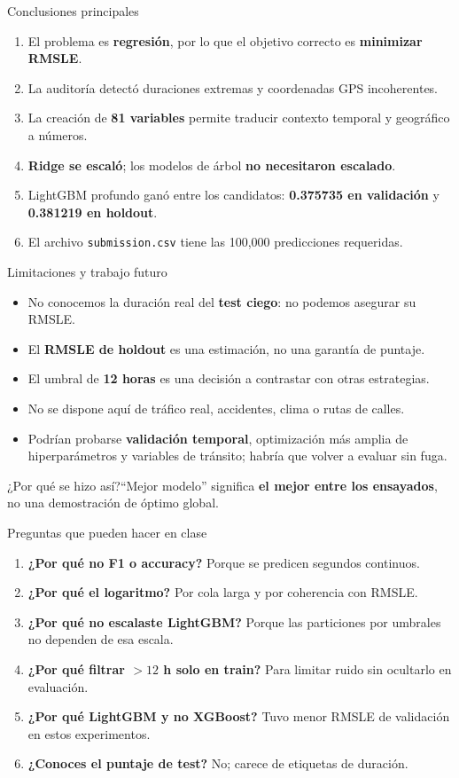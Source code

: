\documentclass[aspectratio=169,11pt]{beamer}
\newcommand{\clav}[1]{\textcolor{UNAMteal}{\textbf{#1}}}
\newcommand{\porq}[1]{\vspace{1.2mm}\begin{block}{¿Por qué se hizo así?}\small #1\end{block}}
\begin{document}
\begin{frame}{Conclusiones principales}
\begin{enumerate}
\item El problema es \textbf{regresión}, por lo que el objetivo correcto es \textbf{minimizar RMSLE}.
\item La auditoría detectó duraciones extremas y coordenadas GPS incoherentes.
\item La creación de \textbf{81 variables} permite traducir contexto temporal y geográfico a números.
\item \textbf{Ridge se escaló}; los modelos de árbol \textbf{no necesitaron escalado}.
\item LightGBM profundo ganó entre los candidatos: \clav{0.375735 en validación} y \clav{0.381219 en holdout}.
\item El archivo \texttt{submission.csv} tiene las 100,000 predicciones requeridas.
\end{enumerate}
\end{frame}

\begin{frame}{Limitaciones y trabajo futuro}
\begin{itemize}
\item No conocemos la duración real del \textbf{test ciego}: no podemos asegurar su RMSLE.
\item El \textbf{RMSLE de holdout} es una estimación, no una garantía de puntaje.
\item El umbral de \textbf{12 horas} es una decisión a contrastar con otras estrategias.
\item No se dispone aquí de tráfico real, accidentes, clima o rutas de calles.
\item Podrían probarse \textbf{validación temporal}, optimización más amplia de hiperparámetros y variables de tránsito; habría que volver a evaluar sin fuga.
\end{itemize}
\porq{``Mejor modelo'' significa \textbf{el mejor entre los ensayados}, no una demostración de óptimo global.}
\end{frame}

\begin{frame}{Preguntas que pueden hacer en clase}
\small
\begin{enumerate}
\item \textbf{¿Por qué no F1 o accuracy?} Porque se predicen segundos continuos.
\item \textbf{¿Por qué el logaritmo?} Por cola larga y por coherencia con RMSLE.
\item \textbf{¿Por qué no escalaste LightGBM?} Porque las particiones por umbrales no dependen de esa escala.
\item \textbf{¿Por qué filtrar $>12$ h solo en train?} Para limitar ruido sin ocultarlo en evaluación.
\item \textbf{¿Por qué LightGBM y no XGBoost?} Tuvo menor RMSLE de validación en estos experimentos.
\item \textbf{¿Conoces el puntaje de test?} No; carece de etiquetas de duración.
\end{enumerate}
\end{frame}
\end{document}
